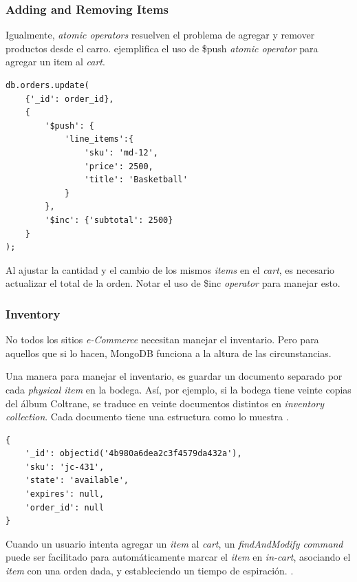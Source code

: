  
\subsubsection*{Adding and Removing Items}

Igualmente, \textit{atomic operators} resuelven el problema de agregar y remover productos desde el carro.  ejemplifica el uso de \$push \textit{atomic operator} para agregar un item al \textit{cart}.

\begin{lstlisting}[caption= Ejemplo del operador \$push., label=source:javascript:example_push_operator_mongodb]
db.orders.update(
	{'_id': order_id},
    {
    	'$push': {
    		'line_items':{
    			'sku': 'md-12',
    			'price': 2500,
    			'title': 'Basketball'
    		}
    	},
    	'$inc': {'subtotal': 2500}
    }
);
\end{lstlisting}

Al ajustar la cantidad y el cambio de los mismos \textit{items} en el \textit{cart}, es necesario actualizar el total de la orden. Notar el uso de \$inc \textit{operator} para manejar esto.

\subsubsection{Inventory}

No todos los sitios \textit{e-Commerce} necesitan manejar el inventario. Pero para aquellos que si lo hacen, MongoDB funciona a la altura de las circunstancias.

Una manera para manejar el inventario, es guardar un documento separado por cada \textit{physical item} en la bodega. Así, por ejemplo, si la bodega tiene veinte copias del álbum Coltrane, se traduce en veinte documentos distintos en \textit{inventory collection}. Cada documento tiene una estructura como lo muestra .

\begin{lstlisting}[caption= Ejemplo de documento para un \textit{item}., label=source:javascript:example_document_inventory_mongodb]
{
	'_id': objectid('4b980a6dea2c3f4579da432a'),
	'sku': 'jc-431',
	'state': 'available',
	'expires': null,
	'order_id': null
}
\end{lstlisting}


Cuando un usuario intenta agregar un \textit{item} al \textit{cart}, un \textit{findAndModify command} puede ser facilitado para automáticamente marcar el \textit{item} en \textit{in-cart}, asociando el \textit{item} con una orden dada, y estableciendo un tiempo de espiración. .


